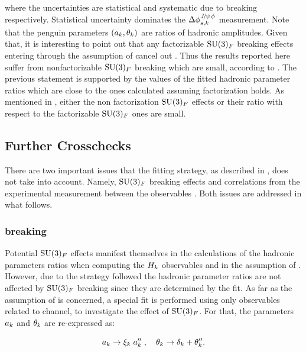 \noindent where the uncertainties are statistical and systematic due to \grpsuthree breaking respectively.
Statistical uncertainty dominates the $\Delta\phi^{{J\mskip -3mu/\mskip -2mu\psi\mskip 2mu}\phi}_{s,{k}}$ measurement.
Note that the penguin parameters $(a_k,\theta_k)$ are ratios of hadronic amplitudes.
Given that, it is interesting to point out that any factorizable $\mathrm{SU}(3)_F$ breaking
effects entering through the assumption of  cancel out \cite{Fleischer:1999zi}.
Thus the results reported here suffer from nonfactorizable $\mathrm{SU}(3)_F$ breaking which are small,
according to \cite{DeBruyn:2014oga,DeBruyn-thesis}. The previous statement is supported by the values of the fitted hadronic parameter
ratios which are close to the ones calculated assuming factorization holds. As mentioned in \cite{DeBruyn:2014oga,DeBruyn-thesis},
either the non factorization $\mathrm{SU}(3)_F$ effects or their ratio with respect to the factorizable $\mathrm{SU}(3)_F$
ones are small.

\subsection{Further Crosschecks}
There are two important issues that the fitting strategy, as described in ,
does not take into account. Namely, $\mathrm{SU}(3)_F$ breaking effects and correlations from the
experimental measurement between the observables . Both issues are addressed in what follows.

\subsubsection{\grpsuthree breaking}
\label{su3_breaking}
Potential $\mathrm{SU}(3)_F$ effects manifest themselves in the calculations of the hadronic parameters ratios
when computing the $H_{k}$ observables and in the assumption of . However, due to the
strategy followed the hadronic parameter ratios are not affected by $\mathrm{SU}(3)_F$ breaking since they
are determined by the fit. As far as the assumption of  is concerned, a special fit is
performed using only observables related to \BdJpsiRho channel, to investigate the effect of $\mathrm{SU}(3)_F$.
For that, the parameters $a_k$ and $\theta_k$ are re-expressed as:

\begin{equation}
  \centering
  \akPeng \to \xi_k \; \akPeng'' \;, \quad \thkPeng \to \delta_k + \thkPeng''.
\label{su3_breaking_invoke}
\end{equation}

